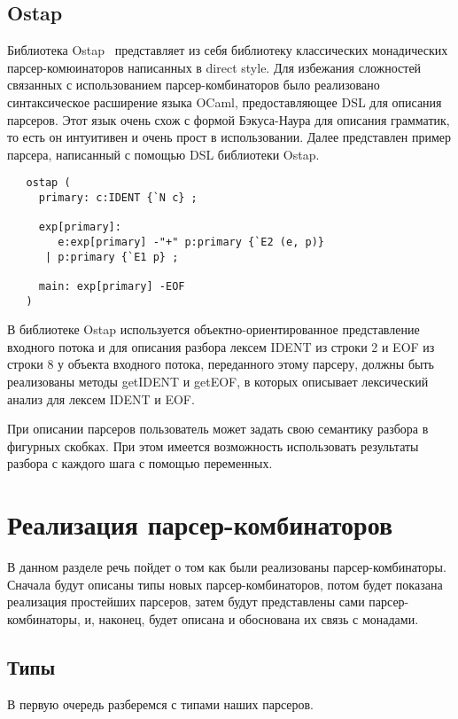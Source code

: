 \documentclass[conference]{IEEEtran}
\begin{document}
\subsection{Ostap}

Библиотека Ostap~\cite{ostap} представляет из себя библиотеку классических монадических парсер-комюинаторов написанных в direct style. Для избежания сложностей связанных с использованием парсер-комбинаторов было реализовано синтаксическое расширение языка OCaml, предоставляющее DSL для описания парсеров. Этот язык очень схож с формой Бэкуса-Наура для описания грамматик, то есть он интуитивен и очень прост в использовании. Далее представлен пример парсера, написанный с помощью DSL библиотеки Ostap.

\begin{lstlisting}
   ostap (
     primary: c:IDENT {`N c} ;

     exp[primary]:
        e:exp[primary] -"+" p:primary {`E2 (e, p)}
      | p:primary {`E1 p} ;

     main: exp[primary] -EOF
   )
  \end{lstlisting}

В библиотеке Ostap используется объектно-ориентированное представление входного потока и для описания разбора лексем IDENT из строки 2 и EOF из строки 8 у объекта входного потока, переданного этому парсеру, должны быть реализованы методы getIDENT и getEOF, в которых описывает лексический анализ для лексем IDENT и EOF.

При описании парсеров пользователь может задать свою семантику разбора в фигурных скобках. При этом имеется возможность использовать результаты разбора с каждого шага с помощью переменных.

\section{Реализация парсер-комбинаторов}

В данном разделе речь пойдет о том как были реализованы парсер-комбинаторы. Сначала будут описаны типы новых парсер-комбинаторов, потом будет показана реализация простейших парсеров,
затем будут представлены сами парсер-комбинаторы, и, наконец, будет описана и обоснована их связь с монадами.

\subsection{Типы}
В первую очередь разберемся с типами наших парсеров.
\end{document}
